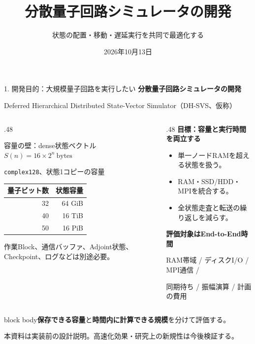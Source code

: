 \documentclass[aspectratio=169,10pt,hyperref={unicode,hidelinks}]{beamer}
\title{分散量子回路シミュレータの開発}
\subtitle{状態の配置・移動・遅延実行を共同で最適化する}
\date{2026年10月13日}
\newcommand{\takeaway}[1]{\par\vspace{2mm}\begin{beamercolorbox}[wd=\textwidth,sep=1.5mm]{block body}\small #1\end{beamercolorbox}\par}
\newcommand{\smallnote}[1]{\par{\footnotesize\color{muted}#1\par}}
\begin{document}
\begin{frame}{1. 開発目的：大規模量子回路を実行したい}
  {\large\bfseries 分散量子回路シミュレータの開発}\par
  \smallnote{Deferred Hierarchical Distributed State-Vector Simulator（DH-SVS、仮称）}
  \begin{columns}[T,onlytextwidth]
    \begin{column}{.48\textwidth}
      \begin{block}{容量の壁：dense状態ベクトル}
        \centering $S(n)=16\times 2^n\ \mathrm{bytes}$\par
        \small\texttt{complex128}、状態1コピーの容量\par
        \medskip
        \begin{tabular}{rr}
          \toprule 量子ビット数 & 状態容量 \\
          \midrule 32 & 64 GiB \\40 & 16 TiB \\50 & 16 PiB \\
          \bottomrule
        \end{tabular}
      \end{block}
      \smallnote{作業Block、通信バッファ、Adjoint状態、Checkpoint、ログなどは別途必要。}
    \end{column}
    \begin{column}{.48\textwidth}
      \textbf{目標：容量と実行時間を両立する}
      \begin{itemize}
        \item 単一ノードRAMを超える状態を扱う。
        \item RAM・SSD/HDD・MPIを統合する。
        \item 全状態走査と転送の繰り返しを減らす。
      \end{itemize}
      \medskip
      \textbf{評価対象はEnd-to-End時間}\par
      \small RAM帯域 / ディスクI/O / MPI通信 /\par
      同期待ち / 振幅演算 / 計画の費用
    \end{column}
  \end{columns}
  \takeaway{\textbf{保存できる容量}と\textbf{時間内に計算できる規模}を分けて評価する。}
  \smallnote{本資料は実装前の設計説明。高速化効果・研究上の新規性は今後検証する。}
\end{frame}
\end{document}
